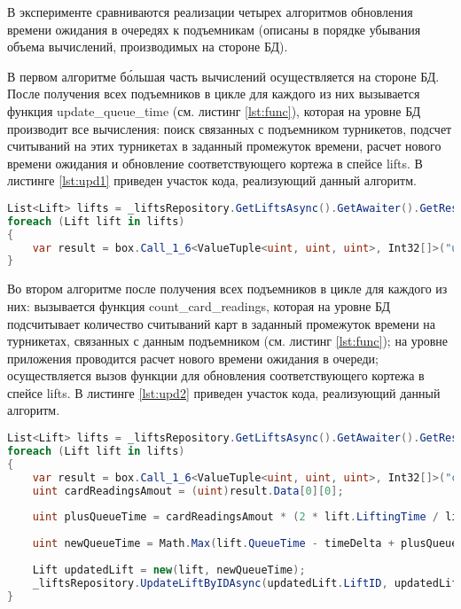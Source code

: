 В эксперименте сравниваются реализации четырех алгоритмов обновления времени ожидания в очередях к подъемникам (описаны в порядке убывания объема вычислений, производимых на стороне БД).

В первом алгоритме б\'{о}льшая часть вычислений осуществляется на стороне БД. После получения всех подъемников в цикле для каждого из них вызывается функция update\_queue\_time (см. листинг \ref{lst:func}), которая на уровне БД производит все вычисления: поиск связанных с подъемником турникетов, подсчет считываний на этих турникетах в заданный промежуток времени,  расчет нового времени ожидания и обновление соответствующего кортежа в спейсе lifts. В листинге \ref{lst:upd1} приведен участок кода, реализующий данный алгоритм.

\captionsetup{justification=centering,singlelinecheck=off}
\begin{lstlisting}[label=lst:upd1, caption=Первый алгоритм обновления времени ожидания в очередях к подъемникам, language=csharp]
List<Lift> lifts = _liftsRepository.GetLiftsAsync().GetAwaiter().GetResult(); 
foreach (Lift lift in lifts)
{
	var result = box.Call_1_6<ValueTuple<uint, uint, uint>, Int32[]>("update_queue_time", (ValueTuple.Create(lift.LiftID, (uint)dateFrom.ToUnixTimeSeconds(), (uint)dateTo.ToUnixTimeSeconds()))).GetAwaiter().GetResult();
}
\end{lstlisting}

Во втором алгоритме после получения всех подъемников в цикле для каждого из них: вызывается функция count\_card\_readings, которая на уровне БД подсчитывает количество считываний карт в заданный промежуток времени на турникетах, связанных с данным подъемником (см. листинг \ref{lst:func}); на уровне приложения проводится расчет нового времени ожидания в очереди; осуществляется вызов функции для обновления соответствующего кортежа в спейсе lifts. В листинге \ref{lst:upd2} приведен участок кода, реализующий данный алгоритм.

\captionsetup{justification=centering,singlelinecheck=off}
\begin{lstlisting}[label=lst:upd2, caption=Второй алгоритм обновления времени ожидания в очередях к подъемникам, language=csharp]
List<Lift> lifts = _liftsRepository.GetLiftsAsync().GetAwaiter().GetResult();
foreach (Lift lift in lifts)
{
	var result = box.Call_1_6<ValueTuple<uint, uint, uint>, Int32[]>("count_card_readings", (ValueTuple.Create(lift.LiftID, (uint)dateFrom.ToUnixTimeSeconds(), (uint)dateTo.ToUnixTimeSeconds()))).GetAwaiter().GetResult();
	uint cardReadingsAmout = (uint)result.Data[0][0];
	
	uint plusQueueTime = cardReadingsAmout * (2 * lift.LiftingTime / lift.SeatsAmount);
	
	uint newQueueTime = Math.Max(lift.QueueTime - timeDelta + plusQueueTime, 0);
	
	Lift updatedLift = new(lift, newQueueTime);
	_liftsRepository.UpdateLiftByIDAsync(updatedLift.LiftID, updatedLift.LiftName, updatedLift.IsOpen, updatedLift.SeatsAmount, updatedLift.LiftingTime).GetAwaiter().GetResult();
}
\end{lstlisting}


